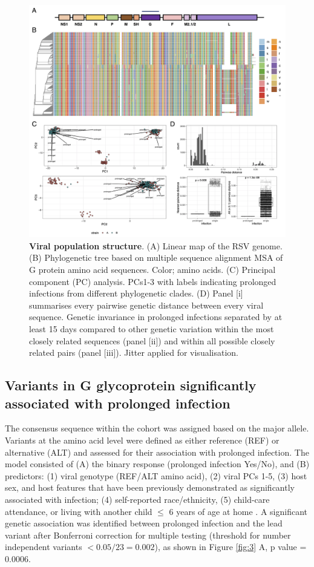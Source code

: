 \documentclass[9pt,lineno]{elife}  %
\begin{document}
\begin{figure}[ht] \hspace{-0.5cm} 
    \includegraphics[scale=0.8]{f2}
	\caption{\textbf{Viral population structure}.
 (A) Linear map of the RSV genome. (B) Phylogenetic tree based on multiple sequence alignment MSA of G protein amino acid sequences. Color; amino acids. (C) Principal component (PC) analysis. PCs1-3 with labels indicating prolonged infections from different phylogenetic clades. (D) Panel [i] summarises every pairwise genetic distance between every viral sequence. Genetic invariance in prolonged infections separated by at least 15 days compared to other genetic variation within the most closely related sequences (panel [ii]) and within all possible closely related pairs (panel [iii]). Jitter applied for visualisation.}
	\label{fig:2} 
\end{figure}
\clearpage

\subsection{Variants in G glycoprotein significantly associated with prolonged infection}
The consensus sequence within the cohort was assigned based on the major allele. 
Variants at the amino acid level were defined as either reference (REF) or alternative (ALT) and assessed for their association with prolonged infection. 
The model consisted of (A) the binary response (prolonged infection Yes/No), and (B) predictors: (1) viral genotype (REF/ALT amino acid), (2) viral PCs 1-5, (3) host sex, and host features that have been previously demonstrated as significantly associated with infection; (4) self-reported race/ethnicity, (5) child-care attendance, or living with another child $\le$ 6 years of age at home 
\citep{hall1976respiratory}. 
A significant genetic association was identified  between prolonged infection and the lead variant after Bonferroni correction for multiple testing (threshold for number independent variants $< 0.05/23 = 0.002$), as shown in Figure \ref{fig:3} A, p value = 0.0006.
\end{document}
